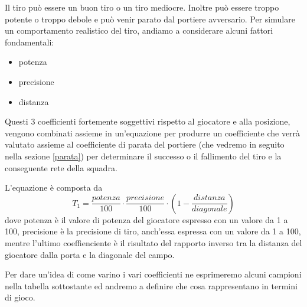 \documentclass[aps,letterpaper,10pt]{article}
\begin{document}
Il tiro pu\`o essere un buon tiro o un tiro mediocre. Inoltre pu\`o essere troppo potente o troppo debole e pu\`o venir parato dal portiere avversario. Per simulare un comportamento realistico del tiro, andiamo a considerare alcuni fattori fondamentali:

\begin{itemize}
	\item potenza
	\item precisione
	\item distanza
\end{itemize}

Questi 3 coefficienti fortemente soggettivi rispetto al giocatore e alla posizione, vengono combinati assieme in un'equazione per produrre un coefficiente che verr\`a valutato assieme al coefficiente di parata del portiere (che vedremo in seguito nella sezione \ref{parata}) per determinare il successo o il fallimento del tiro e la conseguente rete della squadra. \vspace{3mm}

L'equazione \`e composta da $$ T_1 = \frac{potenza}{100} \cdot \frac{precisione}{100} \cdot \left( 1-\frac{distanza}{diagonale} \right) $$ dove potenza \`e il valore di potenza del giocatore espresso con un valore da 1 a 100, precisione \`e la precisione di tiro, anch'essa espressa con un valore da 1 a 100, mentre l'ultimo coeffienciente \`e il risultato del rapporto inverso tra la distanza del giocatore dalla porta e la diagonale del campo. \vspace{3mm}

Per dare un'idea di come varino i vari coefficienti ne esprimeremo alcuni campioni nella tabella sottostante ed andremo a definire che cosa rappresentano in termini di gioco.
\end{document}
